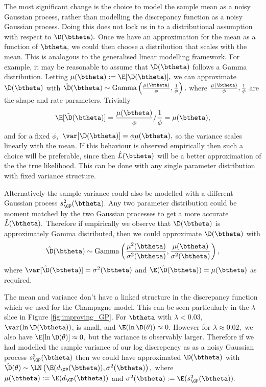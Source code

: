 The most significant change is the choice to model the sample mean as a noisy
Gaussian process, rather than modelling the discrepancy function as a noisy
Gaussian process. Doing this does not lock us in to a distributional assumption
with respect to $\D(\btheta).$ Once we have an approximation for the mean
as a function of $\btheta,$ we could then choose a distribution that scales
with the mean. This is analogous to the generalised linear modelling framework.
For example, it may be reasonable to assume that $\D(\btheta)$ follows a
Gamma distribution. Letting $\mu(\btheta) := \E[\D(\btheta)],$ we can
approximate $\D(\btheta)$ with
$
    \hat{\D}(\btheta)
    \sim \mathrm{Gamma}\left(\frac{\mu(\btheta)}{\phi}, \frac{1}{\phi}\right),
$
where $\frac{\mu(\btheta)}{\phi}, \frac{1}{\phi}$ are the shape and rate
parameters. Trivially
$$
    \E[\hat{\D}(\btheta)]
    = \frac{\mu(\btheta)}{\phi}/\frac{1}{\phi} = \mu(\btheta),
$$
and for a fixed $\phi,$ $\var[\D(\btheta)] = \phi\mu(\btheta),$ so the variance
scales linearly with the mean. If this behaviour is observed
empirically then such a choice will be preferable, since then
$\hat{L}(\btheta)$ will be a better approximation of the the
true likelihood. This can be done with any single parameter distribution with
fixed variance structure.

Alternatively the sample variance could also be modelled with a different
Gaussian process $s^2_\GP(\btheta)$.
Any two parameter distribution could be moment matched by
the two Gaussian processes to get a more accurate $\hat{L}(\btheta).$
Therefore if empirically we observe that $\D(\btheta)$ is approximately Gamma
distributed, then we could approximate $\D(\btheta)$ with
$$
    \hat{\D}(\btheta)
    \sim \mathrm{Gamma}\left(
    \frac{\mu^2(\btheta)}{\sigma^2(\btheta)},
    \frac{\mu(\btheta)}{\sigma^2(\btheta)}
    \right),
$$ where $\var[\hat{\D}(\btheta)] = \sigma^2(\btheta)$ and
$\E(\hat{\D}(\btheta)) =\mu(\btheta)$ as required.

The mean and variance don't have a linked structure in the discrepancy function
which we used for the Champagne model.
This can be seen particularly in the $\lambda$ slice in Figure
\ref{fig:improving_GP}.
For $\btheta$ with $\lambda < 0.03,$ $\var(\ln\D(\btheta))$, is small, and
$\E(\ln\D(\theta))\approx 0$. However for $\lambda \approx 0.02,$ we also have
$\E[\ln\D(\theta)] \approx 0,$ but the variance is observably larger. Therefore
if we had modelled the sample variance of our log discrepency as
as a noisy Gaussian process $s^2_\GP(\btheta)$ then we could have approximated
$\D(\btheta)$ with
$\hat{\D}(\theta) \sim \LN\left(\E(d_\GP(\btheta)), \sigma^2(\btheta)\right),$
where $\mu(\btheta) := \E(d_\GP(\btheta))$ and
$\sigma^2(\btheta) := \E(s^2_\GP(\btheta)).$

